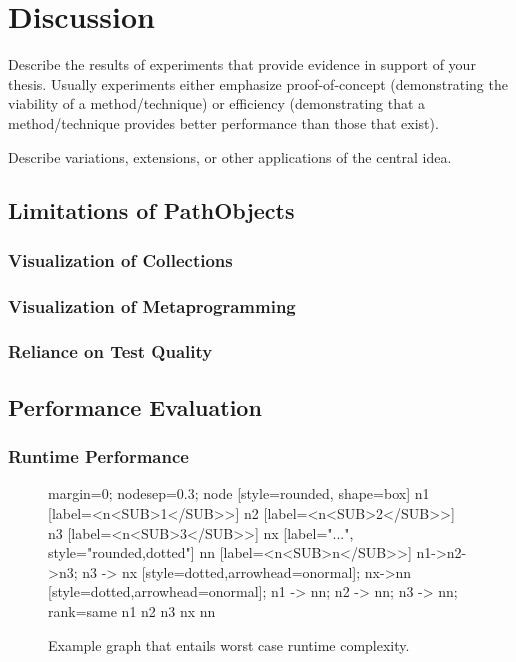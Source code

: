 \chapter{Discussion}
\label{c:discussion}

Describe the results of experiments that provide evidence in support of your thesis. Usually experiments either emphasize proof-of-concept (demonstrating the viability of a method/technique) or efficiency (demonstrating that a method/technique provides better performance than those that exist).

Describe variations, extensions, or other applications of the central idea.

\section{Limitations of PathObjects}
\subsection{Visualization of Collections}
\subsection{Visualization of Metaprogramming}
\subsection{Reliance on Test Quality}

\section{Performance Evaluation}

\subsection{Runtime Performance}

\begin{figure}[b!]
	\centering	
	{
		margin=0;
		nodesep=0.3;
		node [style=rounded, shape=box]
		n1 [label=<n<SUB>1</SUB>>]
		n2 [label=<n<SUB>2</SUB>>]
		n3 [label=<n<SUB>3</SUB>>]
		nx [label="...", style="rounded,dotted"]
		nn [label=<n<SUB>n</SUB>>]
		n1->n2->n3;
		n3 -> nx [style=dotted,arrowhead=onormal];
		nx->nn [style=dotted,arrowhead=onormal];
		n1 -> nn;
		n2 -> nn;
		n3 -> nn;
		{rank=same n1 n2 n3 nx nn}
	}
	\caption{Example graph that entails worst case runtime complexity.}
\end{figure}

